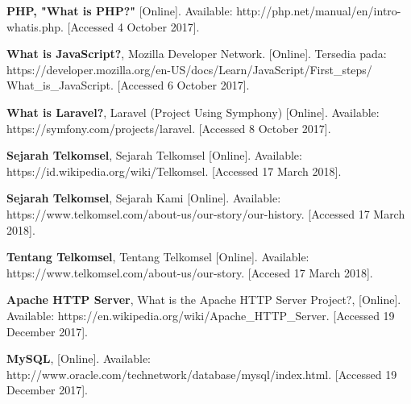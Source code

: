 \begin{thebibliography}{9}
	
	\textbf{PHP, "What is PHP?"} [Online]. Available: http://php.net/manual/en/intro-whatis.php. [Accessed 4 October 2017].		
	
	\textbf{What is JavaScript?}, Mozilla Developer Network. [Online]. Tersedia pada: https://developer.mozilla.org/en-US/docs/Learn/JavaScript/First\_steps/
	What\_is\_JavaScript. [Accessed 6 October 2017].
	
	\textbf{What is Laravel?}, Laravel (Project Using Symphony) [Online]. Available: https://symfony.com/projects/laravel. [Accessed 8 October 2017].
	
	\textbf{Sejarah Telkomsel}, Sejarah Telkomsel [Online]. Available: https://id.wikipedia.org/wiki/Telkomsel. [Accessed 17 March 2018].
	
	\textbf {Sejarah Telkomsel}, Sejarah Kami [Online]. Available: https://www.telkomsel.com/about-us/our-story/our-history. [Accessed 17 March 2018].
	
	\textbf{Tentang Telkomsel}, Tentang Telkomsel [Online]. Available: https://www.telkomsel.com/about-us/our-story. [Accesed 17 March 2018].
	
	\textbf {Apache HTTP Server}, What is the Apache HTTP Server Project?, [Online]. Available: https://en.wikipedia.org/wiki/Apache\_HTTP\_Server. [Accessed 19 December 2017].
	
	\textbf{MySQL}, [Online]. Available: http://www.oracle.com/technetwork/database/mysql/index.html. [Accessed 19 December 2017].
\end{thebibliography}
